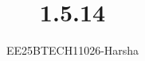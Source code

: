 \documentclass[journal]{IEEEtran}
\begin{document}

\vspace{3cm}

\title{1.5.14}
\author{EE25BTECH11026-Harsha}
 \maketitle
{\let\newpage\relax\maketitle}

\renewcommand{\thefigure}{\theenumi}
\renewcommand{\thetable}{\theenumi}
\setlength{\intextsep}{10pt} %


\renewcommand{\thetable}{\theenumi}
\end{document}

